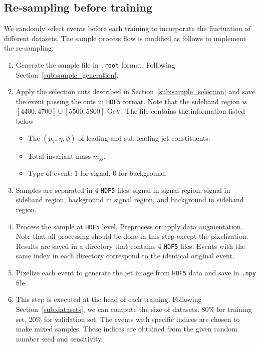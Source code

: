 \documentclass[12pt]{article}
\begin{document}
    \subsection{Re-sampling before training}%
    \label{sub:re_sampling_before_training}
        We randomly select events before each training to incorporate the fluctuation of different datasets. The sample process flow is modified as follows to implement the re-sampling:
        \begin{enumerate}
            \item Generate the sample file in \verb|.root| format. Following Section~\ref{sub:sample_generation}.
            \item Apply the selection cuts described in Section~\ref{sub:sample_selection} and save the event passing the cuts in \verb|HDF5| format. Note that the sideband region is $[4400,4700] \cup [5500,5800] \text{ GeV}$. The file contains the information listed below 
                \begin{itemize}
                    \item The $\left( p_{\text{T}}, \eta, \phi \right) $ of leading and sub-leading jet constituents.
                    \item Total invariant mass $m_{jj}$.
                    \item Type of event: 1 for signal, 0 for background.    
                \end{itemize}
            \item Samples are separated in 4 \verb|HDF5| files: signal in signal region, signal in sideband region, background in signal region, and background in sideband region.
            \item Process the sample at \verb|HDF5| level. Preprocess or apply data augmentation. Note that all processing should be done in this step except the pixelization. Results are saved in a directory that contains 4 \verb|HDF5| files. Events with the same index in each directory correspond to the identical original event.
            \item Pixelize each event to generate the jet image from \verb|HDF5| data and save in \verb|.npy| file.
            \item This step is executed at the head of each training. Following Section~\ref{sub:datasets}, we can compute the size of datasets. 80\% for training set, 20\% for validation set. The events with specific indices are chosen to make mixed samples. These indices are obtained from the given random number seed and sensitivity.


\end{enumerate}
\end{document}
